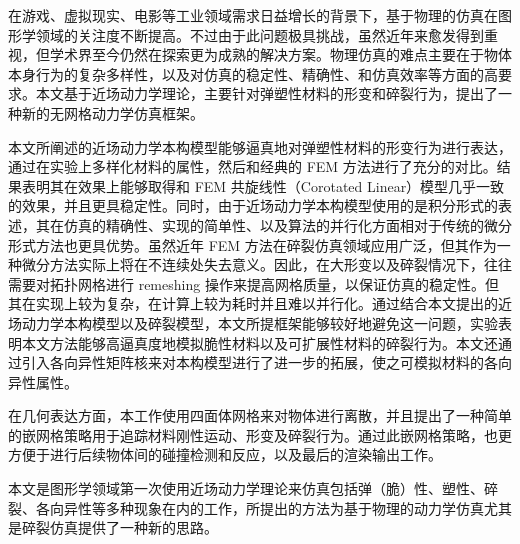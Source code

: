 \begin{cabstract}
在游戏、虚拟现实、电影等工业领域需求日益增长的背景下，基于物理的仿真在图形学领域的关注度不断提高。不过由于此问题极具挑战，虽然近年来愈发得到重视，但学术界至今仍然在探索更为成熟的解决方案。物理仿真的难点主要在于物体本身行为的复杂多样性，以及对仿真的稳定性、精确性、和仿真效率等方面的高要求。本文基于近场动力学理论，主要针对弹塑性材料的形变和碎裂行为，提出了一种新的无网格动力学仿真框架。

本文所阐述的近场动力学本构模型能够逼真地对弹塑性材料的形变行为进行表达，通过在实验上多样化材料的属性，然后和经典的 FEM 方法进行了充分的对比。结果表明其在效果上能够取得和 FEM 共旋线性（Corotated Linear）模型几乎一致的效果，并且更具稳定性。同时，由于近场动力学本构模型使用的是积分形式的表述，其在仿真的精确性、实现的简单性、以及算法的并行化方面相对于传统的微分形式方法也更具优势。虽然近年 FEM 方法在碎裂仿真领域应用广泛，但其作为一种微分方法实际上将在不连续处失去意义。因此，在大形变以及碎裂情况下，往往需要对拓扑网格进行 remeshing 操作来提高网格质量，以保证仿真的稳定性。但其在实现上较为复杂，在计算上较为耗时并且难以并行化。通过结合本文提出的近场动力学本构模型以及碎裂模型，本文所提框架能够较好地避免这一问题，实验表明本文方法能够高逼真度地模拟脆性材料以及可扩展性材料的碎裂行为。本文还通过引入各向异性矩阵核来对本构模型进行了进一步的拓展，使之可模拟材料的各向异性属性。

在几何表达方面，本工作使用四面体网格来对物体进行离散，并且提出了一种简单的嵌网格策略用于追踪材料刚性运动、形变及碎裂行为。通过此嵌网格策略，也更方便于进行后续物体间的碰撞检测和反应，以及最后的渲染输出工作。

本文是图形学领域第一次使用近场动力学理论来仿真包括弹（脆）性、塑性、碎裂、各向异性等多种现象在内的工作，所提出的方法为基于物理的动力学仿真尤其是碎裂仿真提供了一种新的思路。

\end{cabstract}

